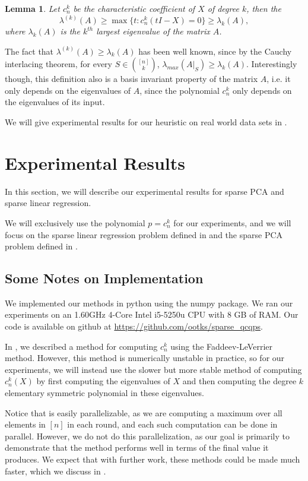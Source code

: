 \documentclass{amsart}
\newtheorem{lemma}[theorem]{Lemma}
\theoremstyle{definition}
\begin{document}
\begin{lemma}
    Let $c_n^k$ be the characteristic coefficient of $X$ of degree $k$, then the
    \[
        \lambda^{(k)}(A) \ge \max \{ t : c_n^k(t I - X) = 0\} \ge \lambda_k(A),
    \]
    where $\lambda_k(A)$ is the $k^{th}$ largest eigenvalue of the matrix $A$.
\end{lemma}
The fact that $\lambda^{(k)}(A) \ge \lambda_k(A)$ has been well known, since by the Cauchy interlacing theorem, for every $S \in \binom{[n]}{k}$, $\lambda_{max}(A|_S) \ge \lambda_k(A)$.
Interestingly though, this definition also is a basis invariant property of the matrix $A$, i.e. it only depends on the eigenvalues of $A$, since the polynomial $c_n^k$ only depends on the eigenvalues of its input.

We will give experimental results for our heuristic on real world data sets in .

\section{Experimental Results}
In this section, we will describe our experimental results for sparse PCA and sparse linear regression.

We will exclusively use the polynomial $p = c_n^k$ for our experiments, and we will focus on the sparse linear regression problem defined in  and the sparse PCA problem defined in .

\subsection{Some Notes on Implementation}
We implemented our methods in python using the numpy package. We ran our experiments on an 1.60GHz 4-Core Intel i5-5250u CPU with 8 GB of RAM.
Our code is available on github at \url{https://github.com/ootks/sparse_qcqps}.

In , we described a method for computing $c_n^k$ using the Faddeev-LeVerrier method.
However, this method is numerically unstable in practice, so for our experiments, we will instead use the slower but more stable method of computing $c_n^k(X)$ by first computing the eigenvalues of $X$ and then computing the degree $k$ elementary symmetric polynomial in these eigenvalues.

Notice that  is easily parallelizable, as we are computing a maximum over all elements in $[n]$ in each round, and each such computation can be done in parallel.
However, we do not do this parallelization, as our goal is primarily to demonstrate that the method performs well in terms of the final value it produces.
We expect that with further work, these methods could be made much faster, which we discuss in .
\end{document}
